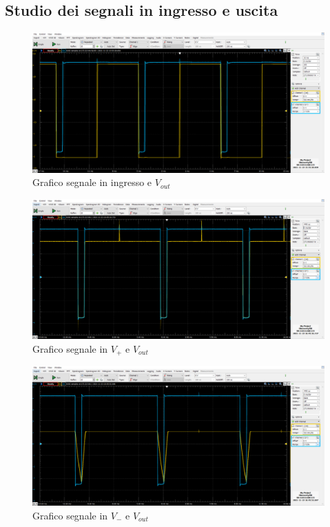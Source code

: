 \documentclass[10pt,a4paper]{article}
\begin{document}
\subsection{Studio dei segnali in ingresso e uscita}
\begin{figure}[htbp]
\centering
\includegraphics[scale=0.42]{monostabile}
\caption{Grafico segnale in ingresso e $V_{out}$}
\end{figure}

\begin{figure}[htbp]
\centering
\includegraphics[scale=0.42]{monostabileV+}
\caption{Grafico segnale in $V_+$ e $V_{out}$}
\end{figure}

\begin{figure}[htbp]
\centering
\includegraphics[scale=0.42]{monostabileV-}
\caption{Grafico segnale in $V_-$ e $V_{out}$}
\end{figure}
\end{document}
